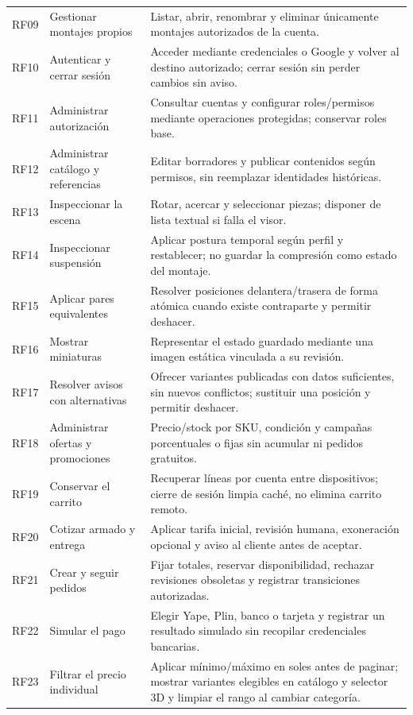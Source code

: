 \documentclass[12pt,letterpaper]{article}
\newenvironment{tabla}{\par\begingroup\normalsize\singlespacing\setlength{\tabcolsep}{5pt}\renewcommand{\arraystretch}{1.25}}{\par\endgroup}
\begin{document}
\begin{tabla}
\begin{longtable}{L{1.05cm}L{4.2cm}L{8.5cm}}
RF09 & Gestionar montajes propios & Listar, abrir, renombrar y eliminar únicamente montajes autorizados de la cuenta.\\
RF10 & Autenticar y cerrar sesión & Acceder mediante credenciales o Google y volver al destino autorizado; cerrar sesión sin perder cambios sin aviso.\\
RF11 & Administrar autorización & Consultar cuentas y configurar roles/permisos mediante operaciones protegidas; conservar roles base.\\
RF12 & Administrar catálogo y referencias & Editar borradores y publicar contenidos según permisos, sin reemplazar identidades históricas.\\
RF13 & Inspeccionar la escena & Rotar, acercar y seleccionar piezas; disponer de lista textual si falla el visor.\\
RF14 & Inspeccionar suspensión & Aplicar postura temporal según perfil y restablecer; no guardar la compresión como estado del montaje.\\
RF15 & Aplicar pares equivalentes & Resolver posiciones delantera/trasera de forma atómica cuando existe contraparte y permitir deshacer.\\
RF16 & Mostrar miniaturas & Representar el estado guardado mediante una imagen estática vinculada a su revisión.\\
RF17 & Resolver avisos con alternativas & Ofrecer variantes publicadas con datos suficientes, sin nuevos conflictos; sustituir una posición y permitir deshacer.\\
RF18 & Administrar ofertas y promociones & Precio/stock por SKU, condición y campañas porcentuales o fijas sin acumular ni pedidos gratuitos.\\
RF19 & Conservar el carrito & Recuperar líneas por cuenta entre dispositivos; cierre de sesión limpia caché, no elimina carrito remoto.\\
RF20 & Cotizar armado y entrega & Aplicar tarifa inicial, revisión humana, exoneración opcional y aviso al cliente antes de aceptar.\\
RF21 & Crear y seguir pedidos & Fijar totales, reservar disponibilidad, rechazar revisiones obsoletas y registrar transiciones autorizadas.\\
RF22 & Simular el pago & Elegir Yape, Plin, banco o tarjeta y registrar un resultado simulado sin recopilar credenciales bancarias.\\
RF23 & Filtrar el precio individual & Aplicar mínimo/máximo en soles antes de paginar; mostrar variantes elegibles en catálogo y selector 3D y limpiar el rango al cambiar categoría.\\\bottomrule
\end{longtable}\end{tabla}
\end{document}
